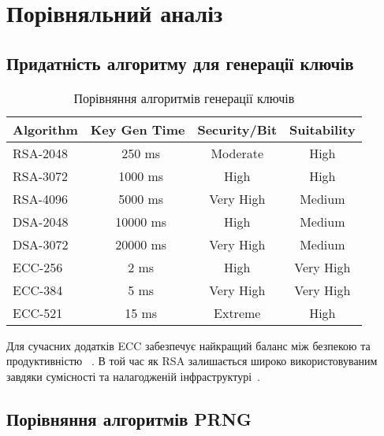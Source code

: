 \section{Порівняльний аналіз}

\subsection{Придатність алгоритму для генерації ключів}

\begin{table}[ht]
    \centering
    \begin{tabular}{|l|c|c|c|}
        \hline
        \textbf{Algorithm} & \textbf{Key Gen Time} & \textbf{Security/Bit} & \textbf{Suitability} \\
        \hline
        RSA-2048           & ~250 ms               & Moderate              & High                 \\
        RSA-3072           & ~1000 ms              & High                  & High                 \\
        RSA-4096           & ~5000 ms              & Very High             & Medium               \\
        \hline
        DSA-2048           & ~10000 ms             & High                  & Medium               \\
        DSA-3072           & ~20000 ms             & Very High             & Medium               \\
        \hline
        ECC-256            & ~2 ms                 & High                  & Very High            \\
        ECC-384            & ~5 ms                 & Very High             & Very High            \\
        ECC-521            & ~15 ms                & Extreme               & High                 \\
        \hline
    \end{tabular}
    \caption{Порівняння алгоритмів генерації ключів}
\end{table}

Для сучасних додатків ECC забезпечує найкращий баланс між безпекою та продуктивністю ~\cite{hankerson2006guide}. 
В той час як RSA залишається широко використовуваним завдяки сумісності та налагодженій інфраструктурі~\cite{schneier2015applied}.

\subsection{Порівняння алгоритмів PRNG}

